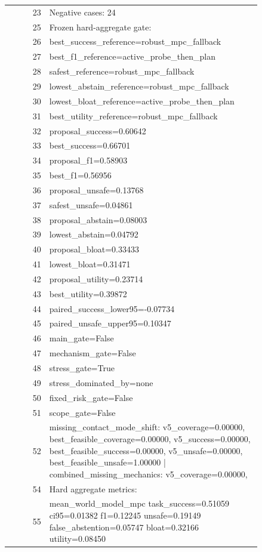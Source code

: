 \documentclass{article}
\begin{document}
\begin{center}
\begin{longtable}{rp{0.84\linewidth}}
23 & Negative cases: 24\\
25 & Frozen hard-aggregate gate:\\
26 & best\_success\_reference=robust\_mpc\_fallback\\
27 & best\_f1\_reference=active\_probe\_then\_plan\\
28 & safest\_reference=robust\_mpc\_fallback\\
29 & lowest\_abstain\_reference=robust\_mpc\_fallback\\
30 & lowest\_bloat\_reference=active\_probe\_then\_plan\\
31 & best\_utility\_reference=robust\_mpc\_fallback\\
32 & proposal\_success=0.60642\\
33 & best\_success=0.66701\\
34 & proposal\_f1=0.58903\\
35 & best\_f1=0.56956\\
36 & proposal\_unsafe=0.13768\\
37 & safest\_unsafe=0.04861\\
38 & proposal\_abstain=0.08003\\
39 & lowest\_abstain=0.04792\\
40 & proposal\_bloat=0.33433\\
41 & lowest\_bloat=0.31471\\
42 & proposal\_utility=0.23714\\
43 & best\_utility=0.39872\\
44 & paired\_success\_lower95=-0.07734\\
45 & paired\_unsafe\_upper95=0.10347\\
46 & main\_gate=False\\
47 & mechanism\_gate=False\\
48 & stress\_gate=True\\
49 & stress\_dominated\_by=none\\
50 & fixed\_risk\_gate=False\\
51 & scope\_gate=False\\
52 & missing\_contact\_mode\_shift: v5\_coverage=0.00000, best\_feasible\_coverage=0.00000, v5\_success=0.00000, best\_feasible\_success=0.00000, v5\_unsafe=0.00000, best\_feasible\_unsafe=1.00000 | combined\_missing\_mechanics: v5\_coverage=0.00000,\\
54 & Hard aggregate metrics:\\
55 & mean\_world\_model\_mpc task\_success=0.51059 ci95=0.01382 f1=0.12245 unsafe=0.19149 false\_abstention=0.05747 bloat=0.32166 utility=0.08450\\

\end{longtable}
\end{center}
\end{document}
